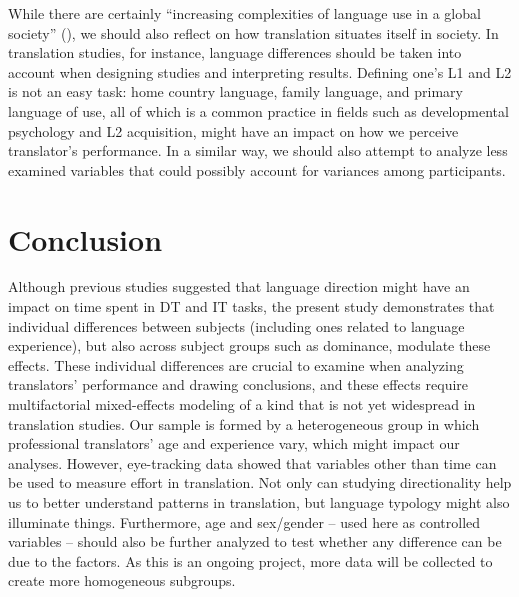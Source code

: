 \documentclass[output=paper]{langscibook}
\begin{document}
While there are certainly “increasing complexities of language use in a global society” (\citealt[110]{kibler2016conceptualizing}), we should also reflect on how translation situates itself in society. In translation studies, for instance, language differences should be taken into account when designing studies and interpreting results. Defining one’s L1 and L2 is not an easy task: home country language, family language, and primary language of use, all of which is a common practice in fields such as developmental psychology and L2 acquisition, might have an impact on how we perceive translator’s performance. In a similar way, we should also attempt to analyze less examined variables that could possibly account for variances among participants.

\section{Conclusion}
Although previous studies \citep{ferreira2016cognitive,ferreira2018decision} suggested that language direction might have an impact on time spent in DT and IT tasks, the present study demonstrates that individual differences between subjects (including ones related to language experience), but also across subject groups such as dominance, modulate these effects. These individual differences are crucial to examine when analyzing translators’ performance and drawing conclusions, and these effects require multifactorial mixed-effects modeling of a kind that is not yet widespread in translation studies. Our sample is formed by a heterogeneous group in which professional translators’ age and experience vary, which might impact our analyses. However, eye-tracking data showed that variables other than time can be used to measure effort in translation. Not only can studying directionality help us to better understand patterns in translation, but language typology might also illuminate things. Furthermore, age and sex/gender -- used here as controlled variables -- should also be further analyzed to test whether any difference can be due to the factors. As this is an ongoing project, more data will be collected to create more homogeneous subgroups.

{\sloppy\printbibliography[heading=subbibliography,notkeyword=this]}
\end{document}
